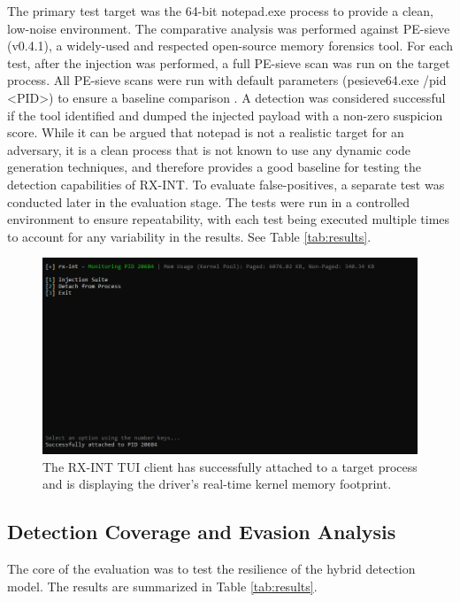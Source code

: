 \documentclass[journal]{IEEEtran}
\begin{document}
The primary test target was the 64-bit notepad.exe process to provide a clean, low-noise environment. The comparative analysis was performed against PE-sieve (v0.4.1), a widely-used and respected open-source memory forensics tool. For each test, after the injection was performed, a full PE-sieve scan was run on the target process. All PE-sieve scans were run with default parameters (pesieve64.exe /pid <PID>) to ensure a baseline comparison \cite{hasherezade_pesieve}. A detection was considered successful if the tool identified and dumped the injected payload with a non-zero suspicion score. While it can be argued that notepad is not a realistic target for an adversary, it is a clean process that is not known to use any dynamic code generation techniques, and therefore provides a good baseline for testing the detection capabilities of RX-INT. To evaluate false-positives, a separate test was conducted later in the evaluation stage. The tests were run in a controlled environment to ensure repeatability, with each test being executed multiple times to account for any variability in the results. See Table \ref{tab:results}.
\begin{figure}[!t]
\centering
\includegraphics[width=0.9\columnwidth]{figures/tui_monitoring.png}
\caption{The RX-INT TUI client has successfully attached to a target process and is displaying the driver's real-time kernel memory footprint.}
\label{fig_tui_main}
\end{figure}
\subsection{Detection Coverage and Evasion Analysis}
The core of the evaluation was to test the resilience of the hybrid detection model. The results are summarized in Table \ref{tab:results}.
\end{document}
